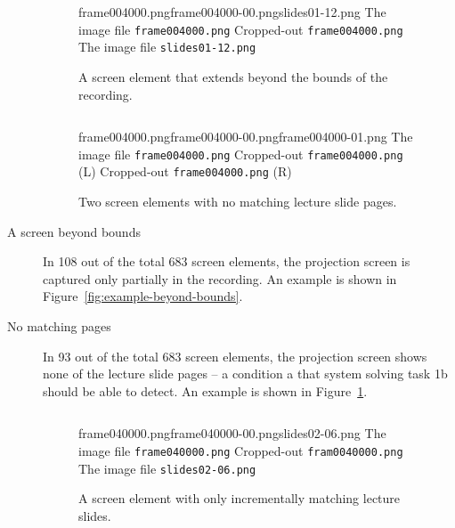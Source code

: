 \begin{description}
  \begin{figure}
    \inputminted{xml}{fig/examples/beyond-bounds/example.xml}\par
      {frame004000.png}{frame004000-00.png}{slides01-12.png}%
      {The image file \texttt{frame004000.png}}%
      {Cropped-out \texttt{frame004000.png}}%
      {The image file \texttt{slides01-12.png}}
    \caption{A screen element that extends beyond the bounds of the recording.}
    \label{fig:example-beyond-bounds}

    \kern\floatsep
    \inputminted{xml}{fig/examples/no-keyrefs/example.xml}\par
      {frame004000.png}{frame004000-00.png}{frame004000-01.png}%
      {The image file \texttt{frame004000.png}}%
      {Cropped-out \texttt{frame004000.png} (L)}%
      {Cropped-out \texttt{frame004000.png} (R)}
    \caption{Two screen elements with no matching lecture slide pages.}
    \label{fig:example-no-keyrefs}
  \end{figure}
  \item[A screen beyond bounds] In 108 out of the total 683 screen elements,
    the projection screen is captured only partially in the recording. An
    example is shown in Figure~\ref{fig:example-beyond-bounds}.
  \item[No matching pages] In 93 out of the total 683 screen elements, the
    projection screen shows none of the lecture slide pages – a condition a
    that system solving task 1b should be able to detect. An example is shown
    in Figure~\ref{fig:example-no-keyrefs}.

  \begin{figure}
    \inputminted{xml}{fig/examples/incremental-only/example.xml}\par
      {frame040000.png}{frame040000-00.png}{slides02-06.png}%
      {The image file \texttt{frame040000.png}}%
      {Cropped-out \texttt{fram0040000.png}}%
      {The image file \texttt{slides02-06.png}}
    \caption{A screen element with only incrementally matching lecture slides.}
    \label{fig:example-incremental-only}


\end{figure}
\end{description}
